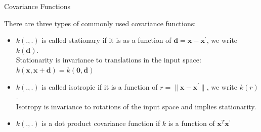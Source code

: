 \documentclass[11pt,compress,t,notes=noshow, xcolor=table]{beamer}
\begin{document}






\begin{vbframe}{Covariance Functions}

There are three types of commonly used covariance functions:

\begin{itemize}

\item $k(.,.)$ is called stationary if it is as a function of $\bm{d} = \bm{x} - \bm{x}^\prime$, we write $k(\bm{d})$.\\
Stationarity is invariance to translations in the input space: $k(\bm{x},\bm{x} + \bm{d}) = k(\bm{0}, \bm{d})$
\item $k(.,.)$ is called isotropic if it is a function of $r = \|\bm{x} - \bm{x}^\prime\|$, we write $k(r)$.\\
Isotropy is invariance to rotations of the input space and implies stationarity. 
\item $k(., .)$ is a dot product covariance function if $k$ is a function of $\bm{x}^T \bm{x}^\prime$
\end{itemize}

\end{vbframe}
\end{document}
